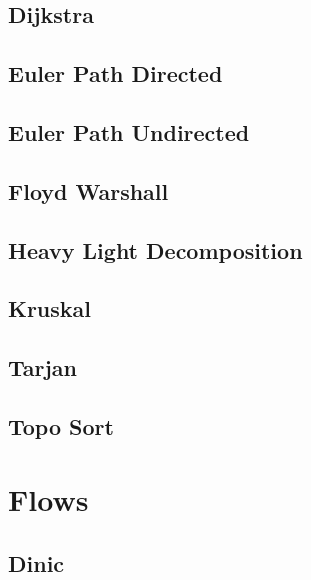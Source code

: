 \subsection{Dijkstra}
\raggedbottom
\hrulefill
\subsection{Euler Path Directed}
\raggedbottom
\hrulefill
\subsection{Euler Path Undirected}
\raggedbottom
\hrulefill
\subsection{Floyd Warshall}
\raggedbottom
\hrulefill
\subsection{Heavy Light Decomposition}
\raggedbottom
\hrulefill
\subsection{Kruskal}
\raggedbottom
\hrulefill
\subsection{Tarjan}
\raggedbottom
\hrulefill
\subsection{Topo Sort}
\raggedbottom
\hrulefill

\section{Flows}
\subsection{Dinic}
\raggedbottom
\hrulefill
